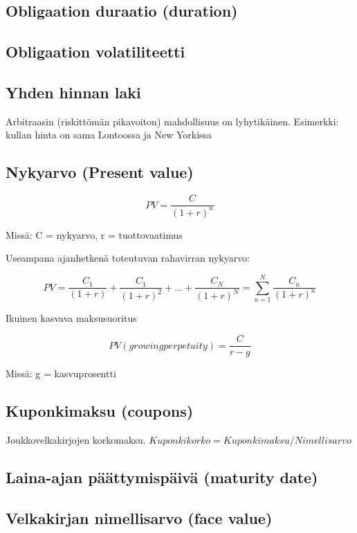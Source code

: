 \documentclass[a4paper]{article}
\begin{document}
\subsection{Obligaation duraatio (duration)}

\subsection{Obligaation volatiliteetti}


\subsection{Yhden hinnan laki}

Arbitraasin (riskittömän pikavoiton) mahdollisuus on lyhytikäinen.
Esimerkki: kullan hinta on sama Lontoossa ja New Yorkissa

\subsection{Nykyarvo (Present value)}

\[
PV = \frac{C}{(1 + r)^n}
\]

Missä: C = nykyarvo, r = tuottovaatimus

Useampana ajanhetkenä toteutuvan rahavirran nykyarvo:

\[
PV = \frac{C_1}{(1 + r)} + \frac{C_1}{(1 + r)^2} + \dots + \frac{C_N}{(1 + r)^N} = \sum_{n=1}^{N} \frac{C_n}{(1 + r)^n}
\]

Ikuinen kasvava maksusuoritus

\[
PV (growing perpetuity) = \frac{C}{r - g}
\]

Missä: g = kasvuprosentti

\subsection{Kuponkimaksu (coupons)}

Joukkovelkakirjojen korkomaksu. $Kuponkikorko = Kuponkimaksu / Nimellisarvo$

\subsection{Laina-ajan päättymispäivä (maturity date)}

\subsection{Velkakirjan nimellisarvo (face value)}
\end{document}
